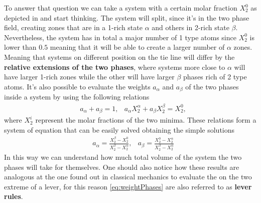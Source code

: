 To answer that question we can take a system with a certain molar fraction $X_2^0$ as depicted in  and start thinking. The system will split, since it's in the two phase field, creating zones that are in a 1-rich state $\alpha$ and others in 2-rich state $\beta$. Nevertheless, the system has in total a major number of 1 type atoms since $X_2^0$ is lower than $0.5$ meaning that it will be able to create a larger number of $\alpha$ zones. Meaning that systems on different position on the tie line will differ by the \textbf{relative extensions of the two phases}, where systems more close to $\alpha$ will have larger 1-rich zones while the other will have larger $\beta$ phases rich of 2 type atoms. It's also possible to evaluate the weights $a_\alpha$ and $a_\beta$ of the two phases inside a system by using the following relations
\begin{align}
    &a_\alpha + a_\beta = 1, &a_\alpha X_2^\alpha + a_\beta X_2^\beta = X_2^0,
\end{align}
where $X_2^i$ represent the molar fractions of the two minima. These relations form a system of equation that can be easily solved obtaining the simple solutions
\begin{align}
    \label{eq:weightPhases}
    &a_\alpha = \frac{X_2^\beta - X_2^0}{X_2^\beta - X_2^\alpha}, &a_\beta = \frac{X_2^0 - X_2^\alpha}{X_2^\beta - X_2^\alpha}
\end{align}
In this way we can understand how much total volume of the system the two phases will take for themselves. One should also notice how these results are analogous at the one found out in classical mechanics to evaluate the on the two extreme of a lever, for this reason \eqref{eq:weightPhases} are also referred to as \textbf{lever rules}.

